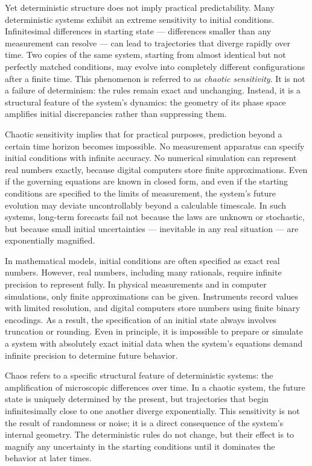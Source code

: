 Yet deterministic structure does not imply practical predictability. Many deterministic systems exhibit an extreme sensitivity to initial conditions. Infinitesimal differences in starting state — differences smaller than any measurement can resolve — can lead to trajectories that diverge rapidly over time. Two copies of the same system, starting from almost identical but not perfectly matched conditions, may evolve into completely different configurations after a finite time. This phenomenon is referred to as \emph{chaotic sensitivity}. It is not a failure of determinism: the rules remain exact and unchanging. Instead, it is a structural feature of the system's dynamics: the geometry of its phase space amplifies initial discrepancies rather than suppressing them.

Chaotic sensitivity implies that for practical purposes, prediction beyond a certain time horizon becomes impossible. No measurement apparatus can specify initial conditions with infinite accuracy. No numerical simulation can represent real numbers exactly, because digital computers store finite approximations. Even if the governing equations are known in closed form, and even if the starting conditions are specified to the limits of measurement, the system’s future evolution may deviate uncontrollably beyond a calculable timescale. In such systems, long-term forecasts fail not because the laws are unknown or stochastic, but because small initial uncertainties — inevitable in any real situation — are exponentially magnified.

In mathematical models, initial conditions are often specified as exact real numbers. However, real numbers, including many rationals, require infinite precision to represent fully. In physical measurements and in computer simulations, only finite approximations can be given. Instruments record values with limited resolution, and digital computers store numbers using finite binary encodings. As a result, the specification of an initial state always involves truncation or rounding. Even in principle, it is impossible to prepare or simulate a system with absolutely exact initial data when the system's equations demand infinite precision to determine future behavior.

Chaos refers to a specific structural feature of deterministic systems: the amplification of microscopic differences over time. In a chaotic system, the future state is uniquely determined by the present, but trajectories that begin infinitesimally close to one another diverge exponentially. This sensitivity is not the result of randomness or noise; it is a direct consequence of the system’s internal geometry. The deterministic rules do not change, but their effect is to magnify any uncertainty in the starting conditions until it dominates the behavior at later times.

